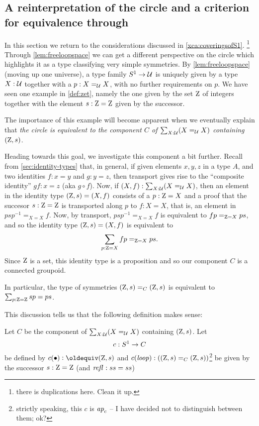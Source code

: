 \subsection{A reinterpretation of the circle and a criterion for equivalence through \coverings}
\label{sec:S1isC}
In this section we return to the considerations discussed in \cref{xca:coveringsofS1}.
 \footnote{there is duplications here.  Clean it up.}
  Through \cref{lem:freeloopspace} we can get a different perspective on the circle which highlights it as a type classifying very simple symmetries.
By \cref{lem:freeloopspace} (moving up one universe), a type family $S^1\to\mathcal{U}$ is uniquely given by a type $X:\mathcal{U}$ together with a $p:X=_{\mathcal{U}} X$, with no further requirements on $p$.  We have seen one example in \cref{def:zet}, namely the one given by the set $\mathrm{Z}$ of integers together with the element $s:\mathrm{Z}=\mathrm{Z}$ given by the successor.  

The importance of this example will become apparent when we eventually explain that \emph{the circle is equivalent to the component $C$ of $\sum_{X:\mathcal{U}}(X=_{\mathcal{U}}X)$ containing $(\mathrm{Z},s)$}. 

Heading towards this goal, we investigate this component a bit further.  Recall from \cref{sec:identity-types} that, in general, if given elements $x,y,z$ in a type $A$, and two identities $f:x=y$ and $g:y=z$, then transport gives rise to the ``composite identity'' $gf:x=z$ (aka $g\circ f$).    Now, if $(X,f):\sum_{X:\mathcal{U}}(X=_{\mathcal{U}}X)$, then an element in the identity type $(\mathrm{Z},s)=(X,f)$ consists of a $p:\mathrm{Z}=X$ and a proof that the succesor $s:\mathrm{Z}=\mathrm{Z}$  is transported along $p$ to $f:X=X$, that is, an element in $psp^{-1}=_{X=X}f$.  Now, by transport, $psp^{-1}=_{X=X}f$ is equivalent to $fp=_{\mathrm{Z}=X}ps$, and so the identity type $(\mathrm{Z},s)=(X,f)$ is equivalent to
$$\sum_{p:\mathrm{Z}=X}fp=_{\mathrm{Z}=X}ps.$$ %
Since $\mathrm{Z}$ is a set, this identity type is a proposition and so our component $C$ is a connected groupoid.  

In particular, the type of symmetries $(\mathrm{Z},s)=_C(\mathrm{Z},s)$ is equivalent to $\sum_{p:\mathrm{Z}=\mathrm{Z}}sp=ps$.  

This discussion tells us that the following definition makes sense:

\begin{definition}\label{def:S1toC}
  Let $C$ be the component of $\sum_{X:\mathcal{U}}(X=_{\mathcal{U}}X)$ containing $(\mathrm{Z},s)$.
  Let $$c:S^1\to C$$ be defined by $c(\base)\defequi (\zet,s)$ and $c(\mathit{loop}):((\mathrm{Z},s)=_C(\mathrm{Z},s))$\footnote{strictly speaking, this $c$ is $\mathop{{\it ap}_{c}}$ -- I have decided not to distinguish between them; ok?} be given by the successor $s:\mathrm{Z}=\mathrm{Z}$ (and $\mathop{{\it refl}_{}}:ss=ss$)
\end{definition}

